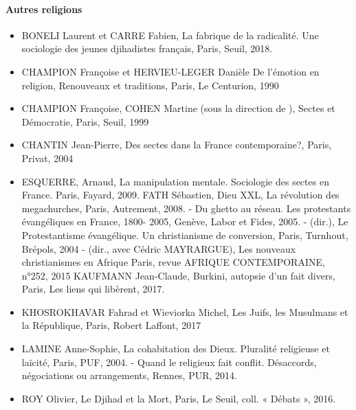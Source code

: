 \paragraph{Autres religions}
\begin{itemize}
  \item BONELI Laurent et CARRE Fabien, La fabrique de la radicalité. Une sociologie des jeunes  djihadistes français, Paris, Seuil, 2018. \item 
  CHAMPION Françoise et HERVIEU-LEGER Danièle De l’émotion en religion,  Renouveaux et traditions, Paris, Le Centurion, 1990 
  \item CHAMPION Françoise, COHEN Martine (sous la direction de ), Sectes et Démocratie,  Paris, Seuil, 1999 
\item  CHANTIN Jean-Pierre, Des sectes dans la France contemporaine?, Paris, Privat, 2004 
\item ESQUERRE, Arnaud, La manipulation mentale. Sociologie des sectes en France.  Paris, Fayard, 2009. FATH Sébastien, Dieu XXL, La révolution des megachurches, Paris, Autrement, 2008. - Du ghetto au réseau. Les protestants évangéliques en France, 1800- 2005, Genève, Labor et Fides, 2005. -  (dir.), Le Protestantisme évangélique. Un christianisme de conversion,  Paris, Turnhout, Brépols, 2004 - (dir., avec Cédric MAYRARGUE), Les nouveaux christianismes en Afrique Paris, revue AFRIQUE CONTEMPORAINE, n°252, 2015 KAUFMANN Jean-Claude, Burkini, autopsie d'un fait divers, Paris, Les liens qui libèrent,  2017. 
\item KHOSROKHAVAR Fahrad et Wieviorka Michel, Les Juifs, les Musulmans et la République,  Paris, Robert Laffont, 2017 
 \item LAMINE Anne-Sophie, La cohabitation des Dieux. Pluralité religieuse et laïcité, Paris,  PUF, 2004.  - Quand le religieux fait conflit. Désaccords, négociations ou arrangements, Rennes, PUR, 2014. 
\item ROY Olivier, Le Djihad et la Mort, Paris, Le Seuil, coll. « Débats », 2016.  
\end{itemize}



